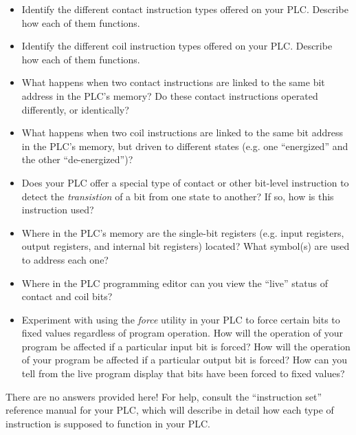 \begin{itemize}
\item{} Identify the different contact instruction types offered on your PLC.  Describe how each of them functions.
\item{} Identify the different coil instruction types offered on your PLC.  Describe how each of them functions.
\item{} What happens when two contact instructions are linked to the same bit address in the PLC's memory?  Do these contact instructions operated differently, or identically?
\item{} What happens when two coil instructions are linked to the same bit address in the PLC's memory, but driven to different states (e.g. one ``energized'' and the other ``de-energized'')?
\item{} Does your PLC offer a special type of contact or other bit-level instruction to detect the {\it transistion} of a bit from one state to another?  If so, how is this instruction used?
\item{} Where in the PLC's memory are the single-bit registers (e.g. input registers, output registers, and internal bit registers) located?  What symbol(s) are used to address each one?
\item{} Where in the PLC programming editor can you view the ``live'' status of contact and coil bits?
\item{} Experiment with using the {\it force} utility in your PLC to force certain bits to fixed values regardless of program operation.  How will the operation of your program be affected if a particular input bit is forced?  How will the operation of your program be affected if a particular output bit is forced?  How can you tell from the live program display that bits have been forced to fixed values?
\end{itemize}







There are no answers provided here!  For help, consult the ``instruction set'' reference manual for your PLC, which will describe in detail how each type of instruction is supposed to function in your PLC.
 







